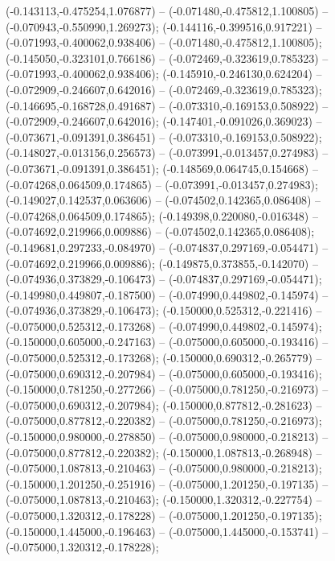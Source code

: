  (-0.143113,-0.475254,1.076877) -- (-0.071480,-0.475812,1.100805) -- (-0.070943,-0.550990,1.269273);
 (-0.144116,-0.399516,0.917221) -- (-0.071993,-0.400062,0.938406) -- (-0.071480,-0.475812,1.100805);
 (-0.145050,-0.323101,0.766186) -- (-0.072469,-0.323619,0.785323) -- (-0.071993,-0.400062,0.938406);
 (-0.145910,-0.246130,0.624204) -- (-0.072909,-0.246607,0.642016) -- (-0.072469,-0.323619,0.785323);
 (-0.146695,-0.168728,0.491687) -- (-0.073310,-0.169153,0.508922) -- (-0.072909,-0.246607,0.642016);
 (-0.147401,-0.091026,0.369023) -- (-0.073671,-0.091391,0.386451) -- (-0.073310,-0.169153,0.508922);
 (-0.148027,-0.013156,0.256573) -- (-0.073991,-0.013457,0.274983) -- (-0.073671,-0.091391,0.386451);
 (-0.148569,0.064745,0.154668) -- (-0.074268,0.064509,0.174865) -- (-0.073991,-0.013457,0.274983);
 (-0.149027,0.142537,0.063606) -- (-0.074502,0.142365,0.086408) -- (-0.074268,0.064509,0.174865);
 (-0.149398,0.220080,-0.016348) -- (-0.074692,0.219966,0.009886) -- (-0.074502,0.142365,0.086408);
 (-0.149681,0.297233,-0.084970) -- (-0.074837,0.297169,-0.054471) -- (-0.074692,0.219966,0.009886);
 (-0.149875,0.373855,-0.142070) -- (-0.074936,0.373829,-0.106473) -- (-0.074837,0.297169,-0.054471);
 (-0.149980,0.449807,-0.187500) -- (-0.074990,0.449802,-0.145974) -- (-0.074936,0.373829,-0.106473);
 (-0.150000,0.525312,-0.221416) -- (-0.075000,0.525312,-0.173268) -- (-0.074990,0.449802,-0.145974);
 (-0.150000,0.605000,-0.247163) -- (-0.075000,0.605000,-0.193416) -- (-0.075000,0.525312,-0.173268);
 (-0.150000,0.690312,-0.265779) -- (-0.075000,0.690312,-0.207984) -- (-0.075000,0.605000,-0.193416);
 (-0.150000,0.781250,-0.277266) -- (-0.075000,0.781250,-0.216973) -- (-0.075000,0.690312,-0.207984);
 (-0.150000,0.877812,-0.281623) -- (-0.075000,0.877812,-0.220382) -- (-0.075000,0.781250,-0.216973);
 (-0.150000,0.980000,-0.278850) -- (-0.075000,0.980000,-0.218213) -- (-0.075000,0.877812,-0.220382);
 (-0.150000,1.087813,-0.268948) -- (-0.075000,1.087813,-0.210463) -- (-0.075000,0.980000,-0.218213);
 (-0.150000,1.201250,-0.251916) -- (-0.075000,1.201250,-0.197135) -- (-0.075000,1.087813,-0.210463);
 (-0.150000,1.320312,-0.227754) -- (-0.075000,1.320312,-0.178228) -- (-0.075000,1.201250,-0.197135);
 (-0.150000,1.445000,-0.196463) -- (-0.075000,1.445000,-0.153741) -- (-0.075000,1.320312,-0.178228);
